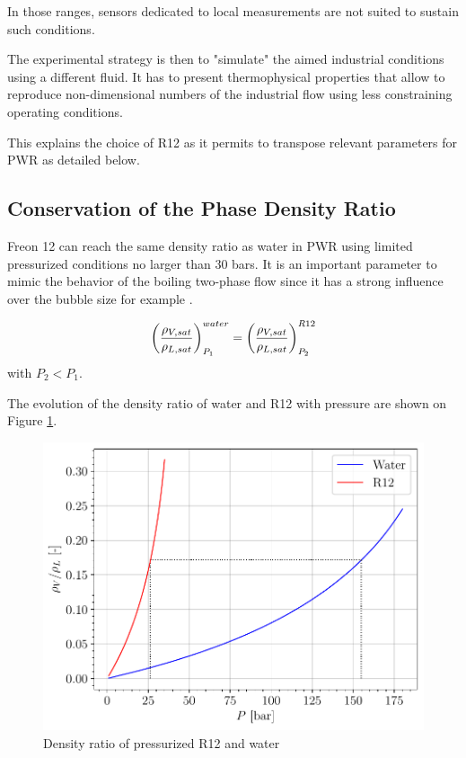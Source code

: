 In those ranges, sensors dedicated to local measurements are not suited to sustain such conditions. 

\npar

The experimental strategy is then to "simulate" the aimed industrial conditions using a different fluid. It has to present thermophysical properties that allow to reproduce non-dimensional numbers of the industrial flow using less constraining operating conditions.

\npar

This explains the choice of R12 as it permits to transpose relevant parameters for PWR as detailed below.

\subsection{Conservation of the Phase Density Ratio}


Freon 12 can reach the same density ratio as water in PWR using limited pressurized conditions no larger than 30 bars. It is an important parameter to mimic the behavior of the boiling two-phase flow since it has a strong influence over the bubble size for example \cite{kocamustafaogullari_pressure_1983}.

\begin{equation}
\left( \frac{\rho_{V,sat}}{\rho_{L,sat}} \right)_{P_{1}}^{water} = \left( \frac{\rho_{V,sat}}{\rho_{L,sat}} \right)_{P_{2}}^{R12}
\end{equation} 
with $P_{2} < P_{1}$.

\npar

The evolution of the density ratio of water and R12 with pressure are shown on Figure \ref{fig:rhost_R12_PWR}.

\begin{figure}[!h]
\centering
\includegraphics[width=0.6\linewidth]{img/DEBORA/rhost_R12_PWR.pdf}
\caption{Density ratio of pressurized R12 and water}
\label{fig:rhost_R12_PWR}
\end{figure}


